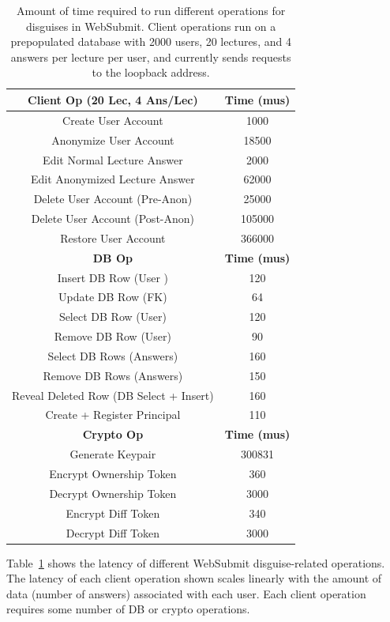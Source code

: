 \begin{table}[t!]
\begin{center}
\begin{tabular}{ c c }
    \textbf{Client Op (20 Lec, 4 Ans/Lec)} & \textbf{Time (mus)}\\
\hline
    Create User Account & 1000\\
    Anonymize User Account & 18500\\
    Edit Normal Lecture Answer & 2000 \\
    Edit Anonymized Lecture Answer & 62000 \\
    Delete User Account (Pre-Anon) & 25000 \\
    Delete User Account (Post-Anon) & 105000 \\
    Restore User Account & 366000 \\
\hline
    \textbf{DB Op} & \textbf{Time (mus)}\\
\hline
Insert DB Row (User )& 120\\
Update DB Row (FK) & 64\\ 
Select DB Row (User) & 120\\
Remove DB Row (User) & 90\\
Select DB Rows (Answers) & 160\\
Remove DB Rows (Answers) & 150\\
Reveal Deleted Row (DB Select + Insert) & 160 \\
Create + Register Principal & 110\\
\hline
    \textbf{Crypto Op} & \textbf{Time (mus)}\\
\hline
Generate Keypair & 300831\\
Encrypt Ownership Token & 360\\
Decrypt Ownership Token & 3000\\
Encrypt Diff Token & 340\\
Decrypt Diff Token & 3000\\
\end{tabular}
\end{center}
\caption{Amount of time required to run different operations for disguises in WebSubmit. Client operations run on a prepopulated database with 2000 users, 20 lectures, and 4 answers per
    lecture per user, and currently sends requests to the loopback address.}
    \label{tab:opstats}
\end{table}

Table~\ref{tab:opstats} shows the latency of different WebSubmit disguise-related operations.  The
latency of each client operation shown scales linearly with the amount of data (\ie number of
answers) associated with each user. Each client operation requires some number of DB or crypto
operations.


